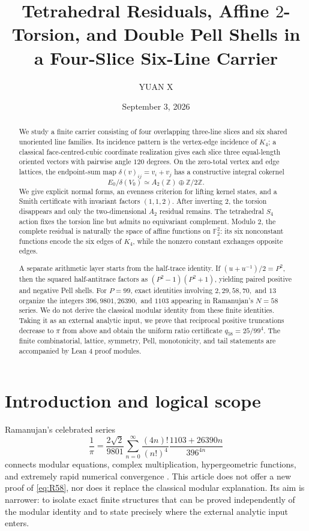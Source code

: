 \documentclass[11pt]{amsart}
\title[Tetrahedral residuals and double Pell shells]{Tetrahedral Residuals, Affine $2$-Torsion, and Double Pell Shells in a Four-Slice Six-Line Carrier}
\author{YUAN X}
\date{September 3, 2026}
\theoremstyle{definition}
\theoremstyle{remark}
\newcommand{\Z}{\mathbb Z}
\newcommand{\F}{\mathbb F}
\begin{document}
\begin{abstract}
We study a finite carrier consisting of four overlapping three-line slices and six shared unoriented line families. Its incidence pattern is the vertex-edge incidence of $K_4$; a classical face-centred-cubic coordinate realization gives each slice three equal-length oriented vectors with pairwise angle $120$ degrees. On the zero-total vertex and edge lattices, the endpoint-sum map $\delta(v)_{ij}=v_i+v_j$ has a constructive integral cokernel
\[
 E_0/\delta(V_0)\simeq A_2(\Z)\oplus\Z/2\Z.
\]
We give explicit normal forms, an evenness criterion for lifting kernel states, and a Smith certificate with invariant factors $(1,1,2)$. After inverting $2$, the torsion disappears and only the two-dimensional $A_2$ residual remains. The tetrahedral $S_4$ action fixes the torsion line but admits no equivariant complement. Modulo $2$, the complete residual is naturally the space of affine functions on $\F_2^2$: its six nonconstant functions encode the six edges of $K_4$, while the nonzero constant exchanges opposite edges.

A separate arithmetic layer starts from the half-trace identity. If $(u+u^{-1})/2=P^2$, then the squared half-antitrace factors as $(P^2-1)(P^2+1)$, yielding paired positive and negative Pell shells. For $P=99$, exact identities involving $2,29,58,70,$ and $13$ organize the integers $396,9801,26390,$ and $1103$ appearing in Ramanujan's $N=58$ series. We do not derive the classical modular identity from these finite identities. Taking it as an external analytic input, we prove that reciprocal positive truncations decrease to $\pi$ from above and obtain the uniform ratio certificate $q_{58}=25/99^4$. The finite combinatorial, lattice, symmetry, Pell, monotonicity, and tail statements are accompanied by Lean 4 proof modules.
\end{abstract}

\maketitle

\section{Introduction and logical scope}

Ramanujan's celebrated series
\begin{equation}\label{eq:R58}
\frac1\pi=
\frac{2\sqrt2}{9801}
\sum_{n=0}^{\infty}
\frac{(4n)!}{(n!)^4}
\frac{1103+26390n}{396^{4n}}
\end{equation}
connects modular equations, complex multiplication, hypergeometric functions, and extremely rapid numerical convergence \cite{Ramanujan1914,BorweinBorwein1987,Berndt1994}. This article does not offer a new proof of \eqref{eq:R58}, nor does it replace the classical modular explanation. Its aim is narrower: to isolate exact finite structures that can be proved independently of the modular identity and to state precisely where the external analytic input enters.
\end{document}
